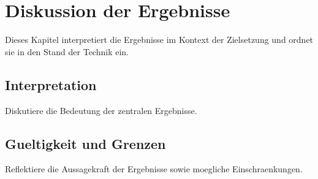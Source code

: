 \section{Diskussion der Ergebnisse}

Dieses Kapitel interpretiert die Ergebnisse im Kontext der Zielsetzung und
ordnet sie in den Stand der Technik ein.

\subsection{Interpretation}

Diskutiere die Bedeutung der zentralen Ergebnisse.

\subsection{Gueltigkeit und Grenzen}

Reflektiere die Aussagekraft der Ergebnisse sowie moegliche Einschraenkungen.
